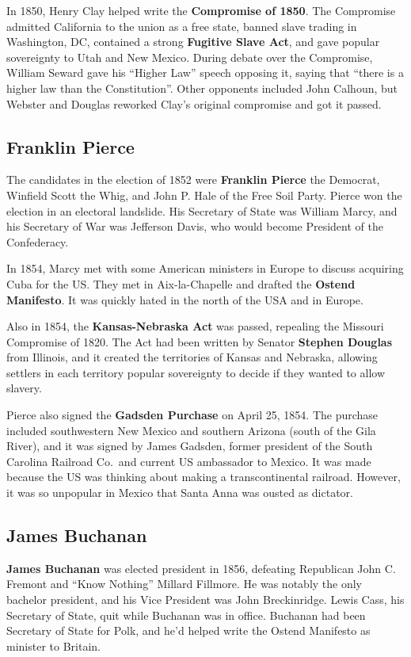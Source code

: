 In 1850, Henry Clay helped write the \textbf{Compromise of 1850}.
The Compromise admitted California to the union as a free state,
banned slave trading in Washington, DC,
contained a strong \textbf{Fugitive Slave Act},
and gave popular sovereignty to Utah and New Mexico.
During debate over the Compromise, William Seward gave his ``Higher Law'' speech opposing it,
saying that ``there is a higher law than the Constitution''.
Other opponents included John Calhoun, but Webster and Douglas reworked Clay's original compromise and got it passed.

\subsection*{Franklin Pierce}

The candidates in the election of 1852 were
\textbf{Franklin Pierce} the Democrat,
Winfield Scott the Whig,
and John P. Hale of the Free Soil Party.
Pierce won the election in an electoral landslide.
His Secretary of State was William Marcy,
and his Secretary of War was Jefferson Davis, who would become President of the Confederacy.

In 1854, Marcy met with some American ministers in Europe to discuss acquiring Cuba for the US\@.
They met in Aix-la-Chapelle and drafted the \textbf{Ostend Manifesto}.
It was quickly hated in the north of the USA and in Europe.

Also in 1854, the \textbf{Kansas-Nebraska Act} was passed, repealing the Missouri Compromise of 1820.
The Act had been written by Senator \textbf{Stephen Douglas} from Illinois,
and it created the territories of Kansas and Nebraska,
allowing settlers in each territory popular sovereignty to decide if they wanted to allow slavery.

Pierce also signed the \textbf{Gadsden Purchase} on April 25, 1854.
The purchase included southwestern New Mexico and southern Arizona (south of the Gila River),
and it was signed by James Gadsden,
former president of the South Carolina Railroad Co.\ and current US ambassador to Mexico.
It was made because the US was thinking about making a transcontinental railroad.
However, it was so unpopular in Mexico that Santa Anna was ousted as dictator.

\subsection*{James Buchanan}

\textbf{James Buchanan} was elected president in 1856,
defeating Republican John C. Fremont and ``Know Nothing'' Millard Fillmore.
He was notably the only bachelor president, and his Vice President was John Breckinridge.
Lewis Cass, his Secretary of State, quit while Buchanan was in office.
Buchanan had been Secretary of State for Polk,
and he'd helped write the Ostend Manifesto as minister to Britain.

